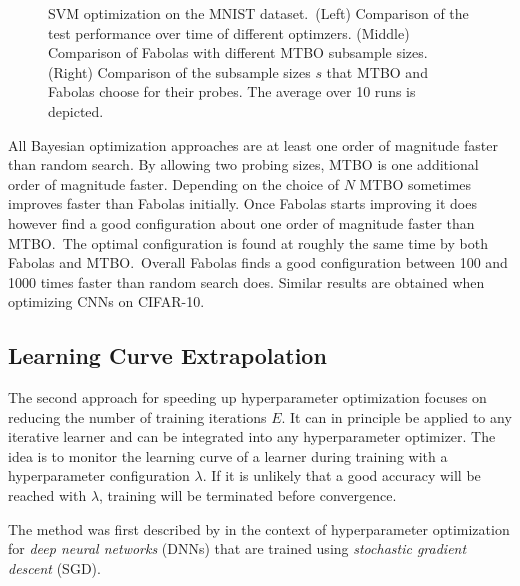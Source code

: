 \begin{figure}
\begin{subfigure}{0.34\textwidth}
	\end{subfigure}
	\caption{
		SVM optimization on the MNIST dataset.\
		(Left) Comparison of the test performance over time of different optimzers.
		(Middle) Comparison of Fabolas with different MTBO subsample sizes.
		(Right) Comparison of the subsample sizes \(s\) that MTBO and Fabolas choose for their probes.
		The average over 10 runs is depicted.
	}\label{fig:fabolas:eval}
\end{figure}
All Bayesian optimization approaches are at least one order of magnitude faster than random search.
By allowing two probing sizes, MTBO is one additional order of magnitude faster.
Depending on the choice of \(N\) MTBO sometimes improves faster than Fabolas initially.
Once Fabolas starts improving it does however find a good configuration about one order of magnitude faster than MTBO.\
The optimal configuration is found at roughly the same time by both Fabolas and MTBO.\
Overall Fabolas finds a good configuration between 100 and 1000 times faster than random search does.
Similar results are obtained when optimizing CNNs on CIFAR-10.

\subsection{Learning Curve Extrapolation}%
\label{sec:hyperparams:earlyterm}

The second approach for speeding up hyperparameter optimization focuses on reducing the number of training iterations \(E\).
It can in principle be applied to any iterative learner and can be integrated into any hyperparameter optimizer.
The idea is to monitor the learning curve of a learner during training with a hyperparameter configuration \(\lambda\).
If it is unlikely that a good accuracy will be reached with \(\lambda\), training will be terminated before convergence.

The method was first described by \citet{Domhan2015} in the context of hyperparameter optimization for \textit{deep neural networks} (DNNs) that are trained using \textit{stochastic gradient descent} (SGD).


